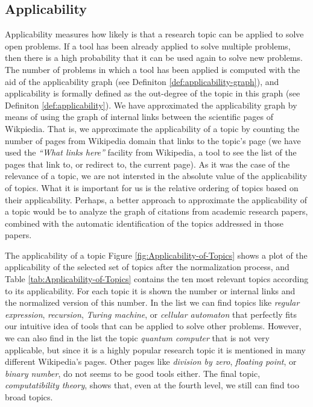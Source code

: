\subsection{Applicability}

Applicability measures how likely is that a research topic can be applied to solve open problems. If a tool has been already applied to solve multiple problems, then there is a high probability that it can be used again to solve new problems. The number of problems in which a tool has been applied is computed with the aid of the applicability graph (see Definiton \ref{def:applicability-graph}), and applicability is formally defined as the out-degree of the topic in this graph (see Definiton \ref{def:applicability}). We have approximated the applicability graph by means of using the graph of internal links between the scientific pages of Wikpiedia. That is, we approximate the applicability of a topic by counting the number of pages from Wikipedia domain that links to the topic's page (we have used the \emph{``What links here''} facility from Wikipedia, a tool to see the list of the pages that link to, or redirect to, the current page). As it was the case of the relevance of a topic, we are not intersted in the absolute value of the applicability of topics. What it is important for us is the relative ordering of topics based on their applicability. Perhaps, a better approach to approximate the applicability of a topic would be to analyze the graph of citations from academic research papers, combined with the automatic identification of the topics addressed in those papers.


The applicability of a topic Figure \ref{fig:Applicability-of-Topics} shows a plot of the applicability of the selected set of topics after the normalization process, and Table \ref{tab:Applicability-of-Topics} contains the ten most relevant topics according to its applicability. For each topic it is shown the number or internal links and the normalized version of this number. In the list we can find topics like \emph{regular expression}, \emph{recursion}, \emph{Turing machine}, or \emph{cellular automaton} that perfectly fits our intuitive idea of tools that can be applied to solve other problems. However, we can also find in the list the topic \emph{quantum computer} that is not very applicable, but since it is a highly popular research topic it is mentioned in many different Wikipedia's pages. Other pages like \emph{division by zero}, \emph{floating point}, or \emph{binary number}, do not seems to be good tools either. The final topic, \emph{computatibility theory}, shows that, even at the fourth level, we still can find too broad topics.

